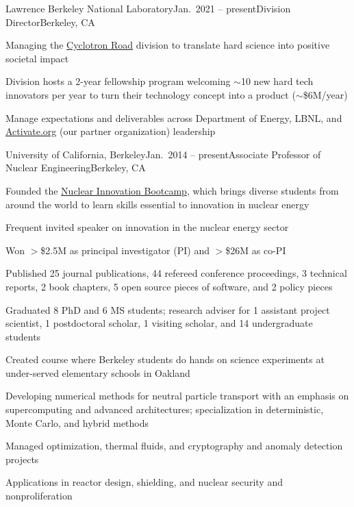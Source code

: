 \begin{rSubsection}{Lawrence Berkeley National Laboratory}{Jan.\ 2021 -- present}{Division Director}{Berkeley, CA}
\item Managing the \href{https://www.cyclotronroad.org/}{Cyclotron Road} division to translate hard science into positive societal impact
\item Division hosts a 2-year fellowship program welcoming $\sim$10 new hard tech innovators per year to turn their technology concept into a product ($\sim$\$6M/year)
\item Manage expectations and deliverables across Department of Energy, LBNL, and \href{https://www.activate.org/}{Activate.org} (our partner organization) leadership
\end{rSubsection}

\begin{rSubsection}{University of California, Berkeley}{Jan.\ 2014 -- present}{Associate Professor of Nuclear Engineering}{Berkeley, CA}
\item Founded the \href{https://www.nuclearinnovationbootcamp.org/}{Nuclear Innovation Bootcamp}, which brings diverse students from around the world to learn skills essential to innovation in nuclear energy 
\item Frequent invited speaker on innovation in the nuclear energy sector
\item Won $>$\$2.5M as principal investigator (PI) and $>$\$26M as co-PI
\item Published 25 journal publications, 44 refereed conference proceedings, 3 technical reports, 2 book chapters, 5 open source pieces of software, and 2 policy pieces
\item Graduated 8 PhD and 6 MS students; research adviser for 1 assistant project scientist, 1 postdoctoral scholar, 1 visiting scholar, and 14 undergraduate students
\item Created course where Berkeley students do hands on science experiments at under-served elementary schools in Oakland
\item Developing numerical methods for neutral particle transport with an emphasis on supercomputing and advanced architectures; specialization in deterministic, Monte Carlo, and hybrid methods
\item Managed optimization, thermal fluids, and cryptography and anomaly detection projects
\item Applications in reactor design, shielding, and nuclear security and nonproliferation
\end{rSubsection}

